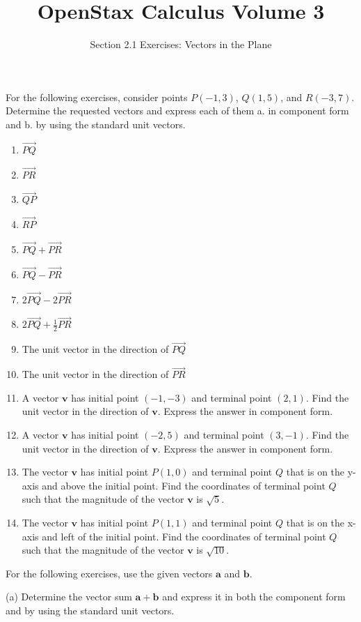 \documentclass{exercises}
\title{OpenStax Calculus Volume 3}
\subtitle{Section 2.1 Exercises: Vectors in the Plane}
\author{}
\date{}
\begin{document}
\maketitle


For the following exercises, consider points $P(-1,3)$, $Q(1,5)$, and $R(-3,7)$. Determine the requested vectors and express each of them a. in component form and b. by using the standard unit vectors.

\begin{enumerate}[start=1]
\item $\overset{\to}{PQ}$
\item $\overset{\to}{PR}$
\item $\overset{\to}{QP}$
\item $\overset{\to}{RP}$
\item $\overset{\to}{PQ}+\overset{\to}{PR}$
\item $\overset{\to}{PQ}-\overset{\to}{PR}$
\item $2\overset{\to}{PQ}-2\overset{\to}{PR}$
\item $2\overset{\to}{PQ}+\frac{1}{2}\overset{\to}{PR}$
\item The unit vector in the direction of $\overset{\to}{PQ}$
\item The unit vector in the direction of $\overset{\to}{PR}$
\item A vector $\mathbf{v}$ has initial point $(-1,-3)$ and terminal point $(2,1)$. Find the unit vector in the direction of $\mathbf{v}$. Express the answer in component form.
\item A vector $\mathbf{v}$ has initial point $(-2,5)$ and terminal point $(3,-1)$. Find the unit vector in the direction of $\mathbf{v}$. Express the answer in component form.
\item The vector $\mathbf{v}$ has initial point $P(1,0)$ and terminal point $Q$ that is on the y-axis and above the initial point. Find the coordinates of terminal point $Q$ such that the magnitude of the vector $\mathbf{v}$ is $\sqrt{5}$.
\item The vector $\mathbf{v}$ has initial point $P(1,1)$ and terminal point $Q$ that is on the x-axis and left of the initial point. Find the coordinates of terminal point $Q$ such that the magnitude of the vector $\mathbf{v}$ is $\sqrt{10}$.
\end{enumerate}

For the following exercises, use the given vectors $\mathbf{a}$ and $\mathbf{b}$.


(a) Determine the vector sum $\mathbf{a}+\mathbf{b}$ and express it in both the component form and by using the standard unit vectors.
\end{document}
